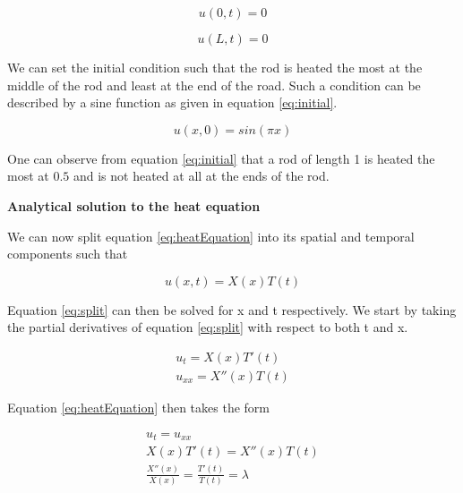 \documentclass[12pt,a4paper]{article}
\begin{document}
\begin{equation}\label{eq:boundary0}
u(0,t) = 0
\end{equation}

\begin{equation}\label{eq:boundaryL}
u(L,t) = 0
\end{equation}

\noindent We can set the initial condition such that the rod is heated the most at the middle of the rod and least at the end of the road. Such a condition can be described by a sine function as given in equation \ref{eq:initial}.

\begin{equation}\label{eq:initial}
u(x,0) = sin(\pi x)
\end{equation}

\noindent One can observe from equation \ref{eq:initial} that a rod of length 1 is heated the most at $0.5$ and is not heated at all at the ends of the rod. 

\begin{center}
\large{\textbf{Analytical solution to the heat equation}}
\end{center}

\noindent We can now split equation \ref{eq:heatEquation} into its spatial and temporal components such that 

\begin{equation}\label{eq:split}
u(x,t) = X(x)T(t)
\end{equation}

\noindent Equation \ref{eq:split} can then be solved for x and t respectively. We start by taking the partial derivatives of equation \ref{eq:split} with respect to both t and x.

\begin{equation}\label{eq:split2}
\begin{aligned}
u_t = X(x)T'(t)
\\
u_{xx} = X''(x)T(t)
\end{aligned}
\end{equation}

\noindent Equation \ref{eq:heatEquation} then takes the form

\begin{equation}\label{eq:heatSplit}
\begin{aligned}
u_t = u_{xx}
\\
X(x)T'(t) = X''(x)T(t)
\\
\frac{X''(x)}{X(x)} = \frac{T'(t)}{T(t)} = \lambda
\end{aligned}
\end{equation}
\end{document}
